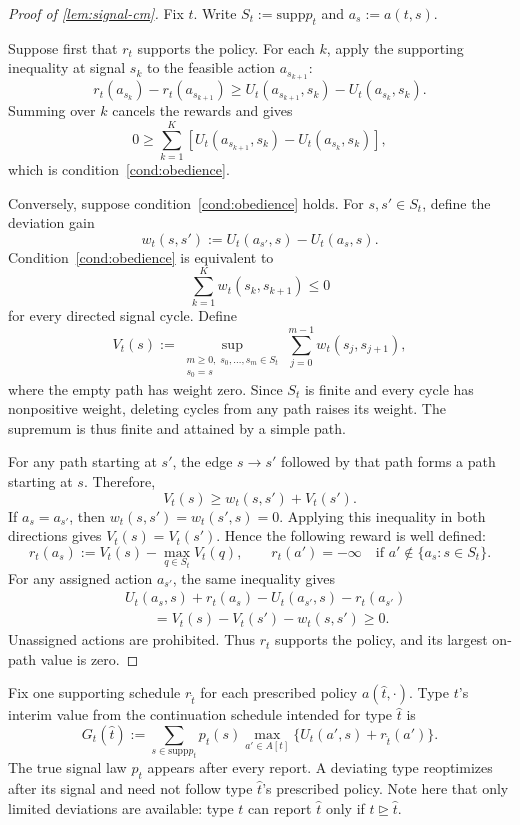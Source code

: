 \documentclass[12pt,reqno]{article}
\newcommand{\supp}{\mathrm{supp}}
\theoremstyle{definition} \newtheorem{example}{Example}
\theoremstyle{definition} \newtheorem{condition}{Condition}
\theoremstyle{definition} \newtheorem{corollary}{Corollary}
\theoremstyle{definition} \newtheorem{claim}{Claim}
\theoremstyle{definition} \newtheorem{definition}{Definition}
\theoremstyle{definition} \newtheorem{conjecture}{Conjecture}
\theoremstyle{definition} \newtheorem{Lemma}{Lemma}
\theoremstyle{definition} \newtheorem{lemma}{Lemma}
\theoremstyle{plain} \newtheorem{theorem}{Theorem}
\theoremstyle{definition} \newtheorem{assumption}{Assumption}
\theoremstyle{definition} \newtheorem*{assumptionnonumber}{Assumption}
\theoremstyle{definition} \newtheorem*{theoremNoNumber}{Proposition}
\theoremstyle{definition}\newtheorem{proposition}{Proposition}
\theoremstyle{definition} \newtheorem{observation}{Observation}
\theoremstyle{definition} \newtheorem*{definitionNoNumber}{Definition}
\theoremstyle{definition} \newtheorem{Definition}{Definition}
\theoremstyle{definition} \newtheorem*{DefinitionNoNumber}{Definition}
\theoremstyle{definition} \newtheorem*{fact}{Fact}
\theoremstyle{definition} \newtheorem*{property}{Property}
\theoremstyle{definition} \newtheorem{remark}{Remark}
\theoremstyle{definition}\newtheorem{romanexampleinner}{Example}
\begin{document}
\begin{proof}[Proof of \cref{lem:signal-cm}]
Fix $t$. Write $S_t:=\supp p_t$ and $a_s:=a(t,s)$.

Suppose first that $r_t$ supports the policy. For each $k$, apply the
supporting inequality at signal $s_k$ to the feasible action
$a_{s_{k+1}}$:
\[
r_t(a_{s_k})-r_t(a_{s_{k+1}})
\geq
U_t(a_{s_{k+1}},s_k)-U_t(a_{s_k},s_k).
\]
Summing over $k$ cancels the rewards and gives
\[
0
\geq
\sum_{k=1}^K
\left[
U_t(a_{s_{k+1}},s_k)-U_t(a_{s_k},s_k)
\right],
\]
which is condition~\eqref{cond:obedience}.

Conversely, suppose condition~\eqref{cond:obedience} holds. For
$s,s'\in S_t$, define the deviation gain
\[
w_t(s,s')
:=
U_t(a_{s'},s)-U_t(a_s,s).
\]
Condition~\eqref{cond:obedience} is equivalent to
\[
\sum_{k=1}^K w_t(s_k,s_{k+1})\leq0
\]
for every directed signal cycle. Define
\[
V_t(s)
:=
\sup_{\substack{m\geq0,\;s_0,\ldots,s_m\in S_t\\s_0=s}}
\sum_{j=0}^{m-1}w_t(s_j,s_{j+1}),
\]
where the empty path has weight zero. Since $S_t$ is finite and every
cycle has nonpositive weight, deleting cycles from any path raises
its weight. The supremum is thus finite and attained by a simple
path.

For any path starting at $s'$, the edge $s\to s'$ followed by that path
forms a path starting at $s$. Therefore,
\[
V_t(s)\geq w_t(s,s')+V_t(s').
\]
If $a_s=a_{s'}$, then $w_t(s,s')=w_t(s',s)=0$. Applying
this inequality in both directions gives $V_t(s)=V_t(s')$.
Hence the following reward is well defined:
\[
r_t(a_s)
:=
V_t(s)-\max_{q\in S_t}V_t(q),
\qquad
r_t(a')=-\infty
\quad\text{if }a'\notin\{a_s:s\in S_t\}.
\]
For any assigned action $a_{s'}$, the same inequality gives
\[
\begin{aligned}
&U_t(a_s,s)+r_t(a_s)
-U_t(a_{s'},s)-r_t(a_{s'})\\
&\qquad
=V_t(s)-V_t(s')-w_t(s,s')
\geq0.
\end{aligned}
\]
Unassigned actions are prohibited. Thus $r_t$ supports the policy, and
its largest on-path value is zero.
\end{proof}

Fix one supporting schedule $r_{\hat t}$ for each prescribed policy $a(\hat t,\cdot)$. Type $t$'s interim value from the continuation schedule intended for type $\hat t$ is
\[
G_t(\hat t)
:=
\sum_{s\in\supp p_t}p_t(s)
\max_{a'\in A[t]}
\big\{U_t(a',s)+r_{\hat t}(a')\big\}.
\]
The true signal law $p_t$ appears after every report. A deviating type reoptimizes after its signal and need not follow type $\hat t$'s prescribed policy. Note here that only limited deviations are available: type $t$ can report $\hat t$ only if $t\trianglerighteq \hat{t}$.
\end{document}
